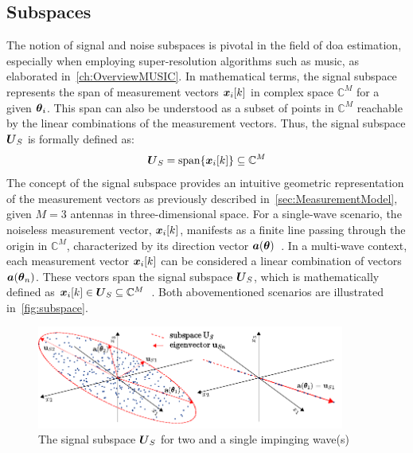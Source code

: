 \subsection{Subspaces}
\label{sec:sub:subspaces}
The notion of signal and noise subspaces is pivotal in the field of \gls{doa} estimation, especially when employing
super-resolution algorithms such as \gls{music}, as elaborated in~\autoref{ch:OverviewMUSIC}.
In mathematical terms, the signal subspace represents the span of measurement vectors \( \boldsymbol{x}_i[k] \) in complex
space \( \mathbb{C}^M \) for a given \( \boldsymbol{\theta}_i \). This span can also be understood as a subset of points in
\( \mathbb{C}^M \) reachable by the linear combinations of the measurement vectors. Thus, the signal subspace
\( \boldsymbol{U}_S \) is formally defined as:
\begin{equation}
    \boldsymbol{U}_S = \mathrm{span}\{\boldsymbol{x}_i[k]\} \subseteq \mathbb{C}^M
\end{equation}
The concept of the signal subspace provides an intuitive geometric representation of the measurement vectors as
previously described in~\autoref{sec:MeasurementModel}, given \( M = 3 \) antennas in three-dimensional space.
For a single-wave scenario, the noiseless measurement vector, \( \boldsymbol{x}_i[k] \), manifests as a finite line
passing through the origin in \( \mathbb{C}^M \), characterized by its direction vector \( \boldsymbol{a}(\boldsymbol{\theta}) \)~\cite{meyer}.
In a multi-wave context, each measurement vector \( \boldsymbol{x}_i[k] \) can be considered a linear combination of
vectors \( \boldsymbol{a}(\boldsymbol{\theta}_n) \). These vectors span the signal subspace \( \boldsymbol{U}_S \), which is mathematically
defined as \( \boldsymbol{x}_i[k] \in \boldsymbol{U}_S \subseteq \mathbb{C}^M \)~\cite{meyer}. Both abovementioned scenarios
are illustrated in~\autoref{fig:subspace}.

\begin{figure}[H]
    \centering
    \includegraphics[width=0.9\textwidth]{figures/02_SignalModel/subspace.pdf}
    \caption{The signal subspace \( \boldsymbol{U}_S \) for two and a single impinging wave(s)~\cite{meyer}}
    \label{fig:subspace}
\end{figure}

